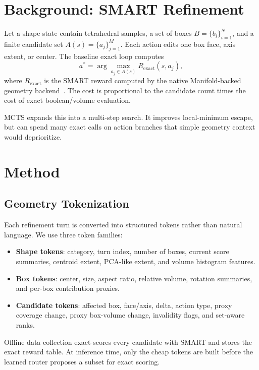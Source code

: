 \documentclass[10pt,twocolumn,letterpaper]{article}
\begin{document}
\section{Background: SMART Refinement}

Let a shape state contain tetrahedral samples, a set of boxes
$B=\{b_i\}_{i=1}^{N}$, and a finite candidate set
$A(s)=\{a_j\}_{j=1}^{M}$.  Each action edits one box face, axis extent, or
center.  The baseline exact loop computes
\begin{equation}
  a^* = \arg\max_{a_j \in A(s)} R_{\text{exact}}(s, a_j),
\end{equation}
where $R_{\text{exact}}$ is the SMART reward computed by the native
Manifold-backed geometry backend~\cite{huang2020manifoldplus}.  The cost is
proportional to the candidate count times the cost of exact boolean/volume
evaluation.

MCTS expands this into a multi-step search.  It improves local-minimum escape,
but can spend many exact calls on action branches that simple geometry context
would deprioritize.

\section{Method}

\subsection{Geometry Tokenization}

Each refinement turn is converted into structured tokens rather than natural
language.  We use three token families:

\begin{itemize}
\item \textbf{Shape tokens}: category, turn index, number of boxes, current
score summaries, centroid extent, PCA-like extent, and volume histogram
features.
\item \textbf{Box tokens}: center, size, aspect ratio, relative volume,
rotation summaries, and per-box contribution proxies.
\item \textbf{Candidate tokens}: affected box, face/axis, delta, action type,
proxy coverage change, proxy box-volume change, invalidity flags, and
set-aware ranks.
\end{itemize}

Offline data collection exact-scores every candidate with SMART and stores the
exact reward table.  At inference time, only the cheap tokens are built before
the learned router proposes a subset for exact scoring.
\end{document}
